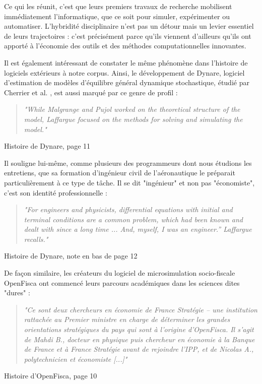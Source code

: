 Ce qui les réunit, c’est que leurs premiers travaux de recherche mobilisent immédiatement l’informatique, que ce soit pour simuler, expérimenter ou automatiser. L’hybridité disciplinaire n’est pas un détour mais un levier essentiel de leurs trajectoires : c’est précisément parce qu’ils viennent d’ailleurs qu’ils ont apporté à l’économie des outils et des méthodes computationnelles innovantes.

Il est également intéressant de constater le même phénomène dans l’histoire de logiciels extérieurs à notre corpus.
Ainsi, le développement de Dynare, logiciel d’estimation de modèles d’équilibre général dynamique stochastique, étudié par Cherrier et al. \cite{cherrierWriteYourModel2023}, est aussi marqué par ce genre de profil :

\begin{quote}
\begin{center}
\textit{"While Malgrange and Pujol worked on the theoretical structure of the model, Laffargue focused on the methods for solving and simulating the model."}
\end{center}
\end{quote} \hfill Histoire de Dynare\cite{cherrierWriteYourModel2023}, page 11

Il souligne lui-même, comme plusieurs des programmeurs dont nous étudions les entretiens, que sa formation d'ingénieur civil de l’aéronautique le préparait particulièrement à ce type de tâche. Il se dit "ingénieur" et non pas "économiste", c'est son identité professionnelle :

\begin{quote}
\begin{center}
\textit{"For engineers and physicists, differential equations with initial and terminal conditions are a common problem, which had been known and dealt with since a long time ... And, myself, I was an engineer.” Laffargue recalls."}
\end{center}
\end{quote} \hfill Histoire de Dynare\cite{cherrierWriteYourModel2023}, note en bas de page 12

De façon similaire, les créateurs du logiciel de microsimulation socio-fiscale OpenFisca ont commencé leurs parcours académiques dans les sciences dites "dures" :

\begin{quote}
\begin{center}
\textit{"Ce sont deux chercheurs en économie de France Stratégie – une institution rattachée au Premier ministre en charge de déterminer les grandes orientations stratégiques du pays qui sont à l’origine d’OpenFisca. Il s’agit de Mahdi B., docteur en physique puis chercheur en économie à la Banque de France et à France Stratégie avant de rejoindre l’IPP, et de Nicolas A., polytechnicien et économiste [...]"}
\end{center}
\end{quote} \hfill Histoire d'OpenFisca\cite{shulzLogicielLibrePour2019}, page 10

